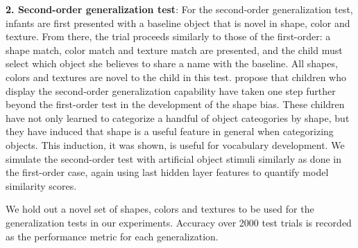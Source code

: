 {\bf2. Second-order generalization test}: For the second-order generalization
test, infants are first presented with a baseline object that is novel in shape,
color and texture. From there, the trial proceeds similarly to those of the
first-order: a shape match, color match and texture match are presented,
and the child must select which object she believes to share a name with the
baseline. All shapes, colors and textures are novel to the child in this test.
\cite{Smith2002} propose that children who display the second-order
generalization capability have taken one step further beyond the first-order
test in the development of the shape bias. These children have not only learned
to categorize a handful of object cateogories by shape, but they have induced
that shape is a useful feature in general when categorizing objects. This
induction, it was shown, is useful for vocabulary development. We simulate
the second-order test with artificial object stimuli similarly as done in the
first-order case, again using last hidden layer features to quantify model similarity
scores.

We hold out a novel set of shapes, colors and textures to be used for the
generalization tests in our experiments. Accuracy over 2000 test trials is
recorded as the performance metric for each generalization.


